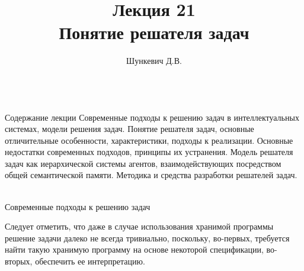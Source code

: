 \title{Лекция 21\\Понятие решателя задач}
\author[]{Шункевич Д.В.}

\begin{frame}
	\titlepage
\end{frame}

\begin{frame}{\\Содержание лекции}
	\topline
	\justifying
	Современные подходы к решению задач в интеллектуальных системах, модели решения задач. Понятие решателя задач, основные отличительные особенности, характеристики, подходы к реализации. Основные недостатки современных подходов, принципы их устранения. Модель решателя задач как иерархической системы агентов, взаимодействующих посредством общей семантической памяти. Методика и средства разработки решателей задач.
\end{frame}

\begin{frame}{\\Современные подходы к решению задач}
	\topline
	\justifying
	\vspace*{\fill}\\
	\footnotesize{
		\begin{SCn}
			\begin{scnindent}
			\end{scnindent}
		\end{SCn}
		Следует отметить, что даже в случае использования хранимой программы решение задачи далеко не всегда тривиально, поскольку, во-первых, требуется найти такую хранимую программу на основе некоторой спецификации, во-вторых, обеспечить ее интерпретацию.
	}
	
\end{frame}


